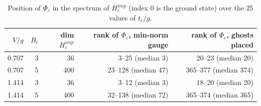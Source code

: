 \begin{table}[h]
\centering\small
\begin{tabular}{r r r r r}
\toprule
$V/g$ & $B_c$ & dim $H^{imp}_c$ & rank of $\Phi_c$, min-norm gauge & rank of $\Phi_c$, ghosts placed\\
\midrule
0.707 & 3 & 36 & 3--25 (median 3) & 20--23 (median 20)\\
0.707 & 5 & 400 & 23--128 (median 47) & 365--377 (median 374)\\
1.414 & 3 & 36 & 3--12 (median 3) & 18--20 (median 20)\\
1.414 & 5 & 400 & 32--138 (median 72) & 365--374 (median 365)\\
\bottomrule
\end{tabular}
\caption{Position of $\Phi_c$ in the spectrum of $H^{imp}_c$ (index $0$ is the ground state) over the $25$ values of $t_c/g$.}
\label{tab:rank}
\end{table}
